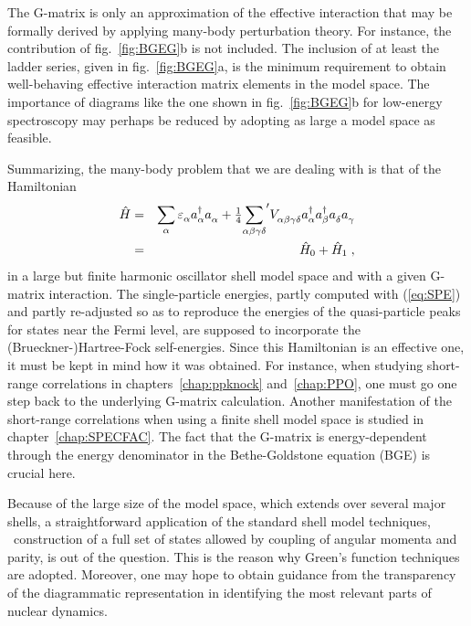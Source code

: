 The G-matrix is only an approximation of the effective interaction that may be 
formally derived by applying many-body perturbation 
theory\cite{Br67a,JB71,Kuo74,EO77}. 
For instance, the contribution of fig.~\ref{fig:BGEG}b is not included. The 
inclusion of at least the ladder series, given in fig.~\ref{fig:BGEG}a, 
is the 
minimum requirement to obtain well-behaving effective interaction matrix 
elements in the model space.
%
The importance of diagrams like the one shown in fig.~\ref{fig:BGEG}b for 
low-energy spectroscopy may perhaps be reduced by adopting as large a model 
space as feasible.

Summarizing, the many-body problem that we are dealing with is that of the 
Hamiltonian 
%
	\begin{eqnarray}
		\hat{H}
	&=&
		\sum_{\alpha}
		\varepsilon^{\phantom{\dagger}}_{\alpha}
		\Oc{\alpha} \Oa{\alpha}
	+
		\sfrac{1}{4}
		{\sum_{\alpha\beta\gamma\delta}}^\prime
		V^{\phantom{\dagger}}_{\alpha\beta\gamma\delta}
		\Oc{\alpha}\Oc{\beta}\Oa{\delta}\Oa{\gamma}
	\nonumber \\
	&=&
		\hat{H}_0
	+
		\hat{H}_1
	\label{eq:Hamiltonian}
	\;,
	\end{eqnarray}
%
in a large but finite harmonic oscillator 
shell model space and with a given G-matrix interaction. The single-particle 
energies, partly computed with (\ref{eq:SPE}) and partly re-adjusted so as
to reproduce the energies of the quasi-particle peaks for states near the 
Fermi level, are 
supposed to incorporate the (Brueckner-)Hartree-Fock self-energies. Since this 
Hamiltonian is an effective one, it must be kept in mind how it was obtained. 
For instance, when studying short-range correlations in 
chapters~\ref{chap:ppknock} and~\ref{chap:PPO},
one must go one step back to the underlying G-matrix calculation.
Another manifestation of the short-range correlations when using a finite 
shell model space is studied in chapter~\ref{chap:SPECFAC}.
The fact that the G-matrix is energy-dependent through the energy 
denominator in the Bethe-Goldstone equation (BGE)
is crucial here. 

Because of the large size of the model space, which extends over several major 
shells, a straightforward application of the standard shell model 
techniques\cite{DeT63,BG77}, \ie\ construction of a full set of states allowed
by coupling of angular momenta and parity, is out of the question. This is the 
reason why Green's function techniques are adopted. Moreover, one may hope to 
obtain guidance from the transparency of the diagrammatic representation in 
identifying the most relevant parts of nuclear dynamics.
